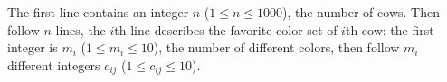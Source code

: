 The first line contains an integer $n$ ($1 \le n \le 1000$), the number of cows.
Then follow $n$ lines, the $i$th line describes the favorite color set of $i$th cow:
the first integer is $m_i$ ($1 \le m_i \le 10$), the number of different colors,
then follow $m_i$ different integers $c_{ij}$ ($1 \le c_{ij} \le 10$).
